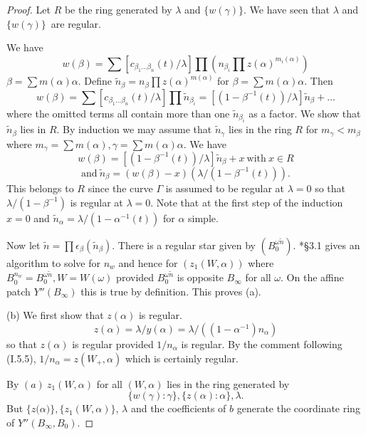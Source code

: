 \documentclass{memo-l}
\theoremstyle{definition}
\theoremstyle{remark}
\numberwithin{section}{chapter}
\numberwithin{equation}{chapter}
\begin{document}
\begin{proof}      Let $R$ be the ring generated by ${\lambda}$ and
$\{w(\gamma)\}$.  We have seen that ${\lambda}$ and $\{w(\gamma)\}$\
are regular.

   We have
$$
w({\beta}) = \sum [c_{\beta_1\ldots \beta_n} (t)/{\lambda}] \prod (n_{\beta_i}
\prod z({\alpha})^{m_i(\alpha)})
$$
${\beta}=\sum m({\alpha}){\alpha}$.
 Define $\tilde n_{{\beta}} = n_{{\beta}} \prod
z({\alpha})^{m({\alpha})}$ for ${\beta} = \sum m({\alpha}){\alpha}$.
 Then
$$
w({\beta}) = \sum [c_{\beta_1\ldots \beta_n} (t)/{\lambda}] \prod
\tilde n_{\beta_i}  = [(1-{\beta}^{-1}(t))/{\lambda}]
\tilde n_{{\beta}} + \ldots
$$
where the omitted terms all contain more than one
$\tilde n_{{\beta_i}}$  as a factor.
 We show that $\tilde n_{{\beta}}$ lies in $R$.
 By induction we may assume that $\tilde n _{{\gamma}}$ lies in the ring $R$
for $m_{{\gamma}} < m_{{\beta}}$ where $m_{{\gamma}} = \sum m({\alpha}),
{\gamma} = \sum m({\alpha}){\alpha}$.
 We have
$$
w({\beta}) = [(1-{\beta}^{-1}(t))/{\lambda}]\tilde n_{{\beta}} + x\
{\text{with}}\ x \in R
$$
$$
{\text{and}}\ \tilde n _{{\beta}} = (w({\beta})-x)({\lambda}/(1-{\beta}^{-1}(t))).
$$
This belongs to $R$ since the curve ${\Gamma}$ is assumed to be regular at
${\lambda}=0$ so that ${\lambda}/(1-{\beta}^{-1})$ is regular at ${\lambda} = 0$.
 Note that at the first step of the induction $x = 0$ and $\tilde n_{{\alpha}}
= {\lambda}/(1-{\alpha}^{-1}(t))$ for ${\alpha}$ simple.

   Now let $\tilde n  = \prod \epsilon_\beta(\tilde n_\beta)$.
 There is a regular star given by $(B_{0}^{\omega\tilde n})$.
\cite{MR701566}*{\S3.1} gives an algorithm to solve for $n_{w}$ and hence for
$(z_{1}(W,{\alpha}))$ where $B_{0}^{n_{w}} = B_{0}^{\omega\tilde n},
W = W({\omega})$ provided $B_{0}^{\omega\tilde n}$  is opposite
$B_{{\infty}}$ for all ${\omega}$.
 On the affine patch $Y''(B_{{\infty}})$ this is true by definition.
 This proves (a).

   (b)  We first show that $z({\alpha})$ is regular.
$$
z({\alpha}) = {\lambda}/y({\alpha}) = {\lambda}/((1-{\alpha}^{-1})n_{{\alpha}})
$$
so that $z({\alpha})$ is regular provided $1/n_{{\alpha}}$ is regular.
 By the comment following (I.5.5), $1/n_{{\alpha}} = z(W_{+},{\alpha})$
which is certainly regular.


   By $(a)\  z_{1}(W,{\alpha})$ for all $(W,{\alpha})$ lies in the ring generated by $$\{w({\gamma}):{\gamma\}, }\{z({\alpha}):{\alpha}\}, {\lambda}.$$
 But $\{z({\alpha)\}, }\{z_{1}(W,{\alpha})\}$, ${\lambda}$ and the coefficients
of $b$ generate the coordinate ring of $Y''(B_{{\infty}},B_{0})$.
\end{proof}
\end{document}
